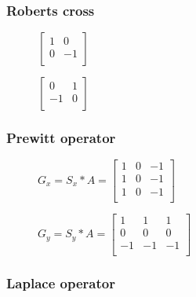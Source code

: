 \subsubsection{Roberts cross}

\begin{figure}[!htb]
    \centering
    \begin{minipage}{.5\textwidth}
        \centering
        $\left[ \begin{array}{rr}
        1 & 0 \\
        0 & -1 \\
        \end{array}\right] $
    \end{minipage}%
    \begin{minipage}{.5\textwidth}
        \centering
        $\left[ \begin{array}{rr}
        0 & 1 \\
        -1 & 0 \\
        \end{array}\right] $
    \end{minipage}
\end{figure}

\subsubsection{Prewitt operator}

\begin{figure}[!htb]
    \centering
    \begin{minipage}{.5\textwidth}
        \centering
        $G_{x} = S_{x} * A =
        \left[ \begin{array}{rrr}
        1 & 0 & -1 \\
        1 & 0 & -1 \\
        1 & 0 & -1 \\
        \end{array}\right] $
    \end{minipage}%
    \begin{minipage}{.5\textwidth}
        \centering
        $G_{y} = S_{y} * A =
        \left[ \begin{array}{rrr}
        1 & 1 & 1 \\
        0 & 0 & 0 \\
        -1 & -1 & -1 \\
        \end{array}\right] $
    \end{minipage}
\end{figure}

\subsubsection{Laplace operator}





%

